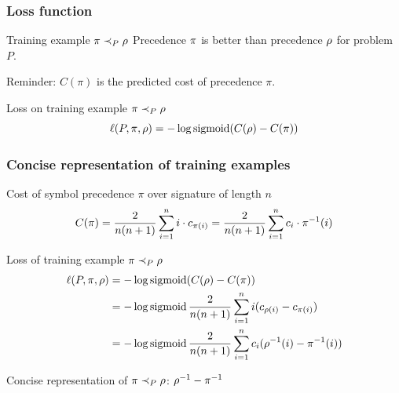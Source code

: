 \documentclass[a4paper]{beamer}
\def\FuncSigmoid(#1){1.0/(1.0 + exp(-(#1)))}
\begin{document}
\begin{frame}
\frametitle{Loss function}

\begin{exampleblock}{Training example $\pi \prec_{P} \rho$}
Precedence $\pi$ is better than precedence $\rho$ for problem $P$.
\end{exampleblock}

Reminder: $C(\pi)$ is the predicted cost of precedence $\pi$.

\begin{block}{Loss on training example $\pi \prec_{P} \rho$}
\begin{equation*}
\ell(P, \pi, \rho) = - \log \operatorname{sigmoid} (C(\rho) - C(\pi))
\end{equation*}

\centering
\end{block}

\end{frame}

\begin{frame}
\frametitle{Concise representation of training examples}
\begin{block}{Cost of symbol precedence $\pi$ over signature of length $n$}
\begin{equation*}
C(\pi)
= \frac{2}{n(n+1)} \sum_{i=1}^n i \cdot c_{\pi(i)}
= \frac{2}{n(n+1)} \sum_{i=1}^n c_i \cdot \pi^{-1}(i)
\end{equation*}
\end{block}

\begin{block}{Loss of training example $\pi \prec_{P} \rho$}
\begin{align*}
\ell(P, \pi, \rho)
&= - \log \operatorname{sigmoid} (C(\rho) - C(\pi)) \\
&= - \log \operatorname{sigmoid} \frac{2}{n(n+1)} \sum_{i=1}^n i (c_{\rho(i)} - c_{\pi(i)}) \\
&= - \log \operatorname{sigmoid} \frac{2}{n(n+1)} \sum_{i=1}^n c_i (\rho^{-1}(i) - \pi^{-1}(i))
\end{align*}
\end{block}

Concise representation of $\pi \prec_{P} \rho$:
$\rho^{-1} - \pi^{-1}$
\end{frame}
\end{document}
